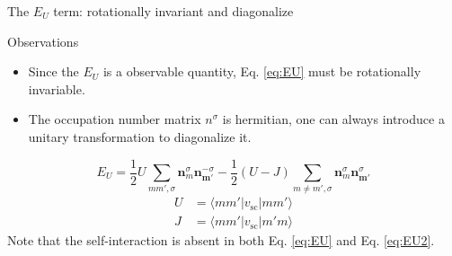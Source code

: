 \documentclass{beamer}
\begin{document}
  \begin{frame}{The \(E_U\) term: rotationally invariant and diagonalize}
    \begin{block}{Observations}
      \begin{itemize}
        \item Since the \(E_U\) is a observable quantity, Eq. \eqref{eq:EU} must be rotationally invariable.
        \item The occupation number matrix \(n^{\sigma}\) is hermitian, one can always introduce a unitary transformation to diagonalize it.
      \end{itemize}
    \end{block}
    \begin{equation}\label{eq:EU2}
      E_U = \frac{1}{2}U\sum_{mm',\sigma}\bm{n}^\sigma_{m}\bm{n}^{-\sigma}_{\bm{m'}} - \frac{1}{2}(U-J)\sum_{m\ne{}m',\sigma}\bm{n}^\sigma_{m}\bm{n}^{\sigma}_{\bm{m'}}
    \end{equation}
    \begin{subequations}
      \begin{align}
        U &= \langle{}mm'|v_{\text{sc}}|mm'\rangle\\
        J &= \langle{}mm'|v_{\text{sc}}|m'm\rangle
      \end{align}
    \end{subequations}
    Note that the self-interaction is absent in both Eq. \eqref{eq:EU} and Eq. \eqref{eq:EU2}.
  \end{frame}
\end{document}
